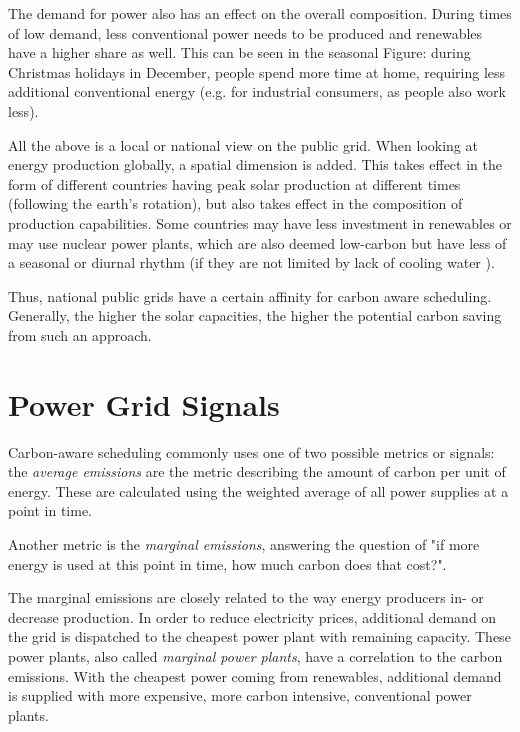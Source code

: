 The demand for power also has an effect on the overall composition. 
During times of low demand, less conventional power needs to be produced and renewables have a higher share as well.
This can be seen in the seasonal Figure: during Christmas holidays in December, people spend more time at home, requiring less additional conventional energy (e.g. for industrial consumers, as people also work less).

All the above is a local or national view on the public grid. 
When looking at energy production globally, a spatial dimension is added. 
This takes effect in the form of different countries having peak solar production at different times (following the earth's rotation), but also takes effect in the composition of production capabilities.
Some countries may have less investment in renewables or may use nuclear power plants, which are also deemed low-carbon but have less of a seasonal or diurnal rhythm (if they are not limited by lack of cooling water ).

Thus, national public grids have a certain affinity for carbon aware scheduling\cite{wiesner_lets_2021}. Generally, the higher the solar capacities, the higher the potential carbon saving from such an approach. 

\section{Power Grid Signals}
Carbon-aware scheduling commonly uses one of two possible metrics or signals: the \emph{average emissions} are the metric describing the amount of carbon per unit of energy. These are calculated using the weighted average of all power supplies at a point in time.

Another metric is the \emph{marginal emissions}, answering the question of "if more energy is used at this point in time, how much carbon does that cost?".

The marginal emissions are closely related to the way energy producers in- or decrease production.
In order to reduce electricity prices, additional demand on the grid is dispatched to the cheapest power plant with remaining capacity. 
These power plants, also called \emph{marginal power plants}, have a correlation to the carbon emissions.
With the cheapest power coming from renewables, additional demand is supplied with more expensive, more carbon intensive, conventional power plants.

